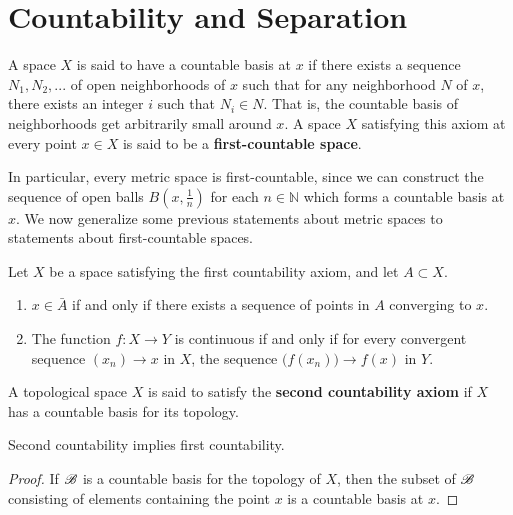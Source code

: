 \section{Countability and Separation}

    \begin{definition}[1st-Countability]
      A space $X$ is said to have a countable basis at $x$ if there exists a sequence $N_1, N_2, ...$ of open neighborhoods of $x$ such that for any neighborhood $N$ of $x$, there exists an integer $i$ such that $N_i \in N$. That is, the countable basis of neighborhoods get arbitrarily small around $x$. A space $X$ satisfying this axiom at every point $x \in X$ is said to be a \textbf{first-countable space}. 
    \end{definition}

    In particular, every metric space is first-countable, since we can construct the sequence of open balls $B (x, \frac{1}{n})$ for each $n \in \mathbb{N}$ which forms a countable basis at $x$. We now generalize some previous statements about metric spaces to statements about first-countable spaces. 

    \begin{theorem}
      Let $X$ be a space satisfying the first countability axiom, and let $A \subset X$. 
      \begin{enumerate}
        \item $x \in \bar{A}$ if and only if there exists a sequence of points in $A$ converging to $x$. 
        \item The function $f: X \longrightarrow Y$ is continuous if and only if for every convergent sequence $(x_n) \rightarrow x$ in $X$, the sequence $\big( f(x_n)\big) \rightarrow f(x)$ in $Y$. 
      \end{enumerate}
    \end{theorem}

    \begin{definition}[2nd-Countability]
      A topological space $X$ is said to satisfy the \textbf{second countability axiom} if $X$ has a countable basis for its topology.
    \end{definition}

    \begin{proposition}
      Second countability implies first countability. 
    \end{proposition}
    \begin{proof}
      If $\B$ is a countable basis for the topology of $X$, then the subset of $\B$ consisting of elements containing the point $x$ is a countable basis at $x$. 
    \end{proof}

